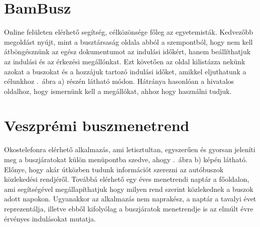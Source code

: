 \section*{BamBusz}
\label{bambusz}

Online felületen elérhető segítség\cite{bambusz}, célközönsége főleg az egyetemisták. 
Kedvezőbb megoldást nyújt, mint a busztársaság oldala abból a szempontból, hogy nem kell átböngésznünk az egész dokumentumot az indulási időkért, hanem beállíthatjuk az indulási és az érkezési megállónkat. 
Ezt követően az oldal kilistázza nekünk azokat a buszokat és a hozzájuk tartozó indulási időket, amikkel eljuthatunk a célunkhoz .\ ábra a) részén látható módon. 
Hátránya hasonlóan a hivatalos oldalhoz, hogy ismernünk kell a megállókat, ahhoz hogy használni tudjuk. 


\section*{Veszprémi buszmenetrend}
\label{veszprbuszmen}

Okostelefonra elérhető alkalmazás\cite{veszprembusz}, ami letisztultan, egyszerűen és gyorsan jeleníti meg a buszjáratokat külön menüpontba szedve, ahogy .\ ábra b) képén látható. 
Előnye, hogy akár útközben tudunk információt szerezni az autóbuszok közlekedési rendjéről. 
Továbbá elérhető egy éves menetrendi naptár a főoldalon, ami segítségével megállapíthatjuk hogy milyen rend szerint közlekednek a buszok adott napokon. 
Ugyanakkor az alkalmazás nem naprakész, a naptár a tavalyi évet reprezentálja, illetve ebből kifolyólag a buszjáratok menetrendje is az elmúlt évre érvényes indulásokat mutatja.

\newpage
